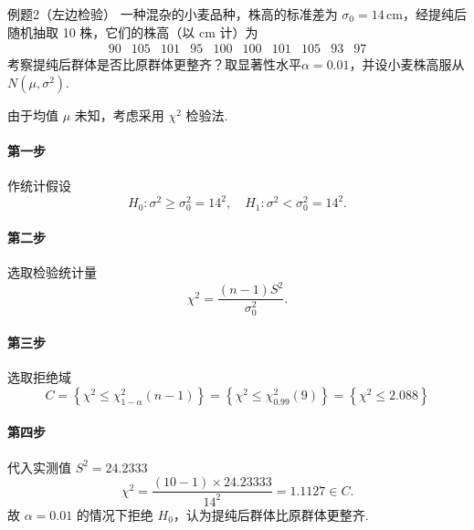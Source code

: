 \begin{question}{例题2（左边检验）}
    一种混杂的小麦品种，株高的标准差为 $\sigma_0 = 14 \,\mathrm{cm}$，经提纯后随机抽取 10 株，它们的株高（以 cm 计）为
    $$
        \begin{array}{cccccccccc}
            90 & 105 & 101 & 95 & 100 & 100 & 101 & 105 & 93 & 97
        \end{array}
    $$
    考察提纯后群体是否比原群体更整齐？取显著性水平$\alpha=0.01$，并设小麦株高服从 $N(\mu, \sigma^2)$.
\end{question}
\begin{solution}
    由于均值 $\mu$ 未知，考虑采用 $\chi^2$ 检验法.
    \paragraph{第一步} 作统计假设
    $$
        H_0: \sigma^2 \geqslant \sigma_0^2 = 14^2, \quad H_1: \sigma^2 < \sigma_0^2 = 14^2.
    $$
    \paragraph{第二步} 选取检验统计量
    $$
        \chi^2 = \frac{(n-1)S^2}{\sigma_0^2}.
    $$
    \paragraph{第三步} 选取拒绝域
    $$
        C = \left\{\chi^2 \leqslant \chi_{1-\alpha}^2(n-1)\right\}
        = \left\{\chi^2 \leqslant \chi_{0.99}^2(9)\right\}
        = \left\{\chi^2 \leqslant 2.088\right\}
    $$
    \paragraph{第四步} 代入实测值 $S^2 = 24.2333$
    $$
        \chi^2 = \frac{(10-1) \times 24.23333}{14^2} = 1.1127 \in C.
    $$
    故 $\alpha = 0.01$ 的情况下拒绝 $H_0$，认为提纯后群体比原群体更整齐.
\end{solution}




